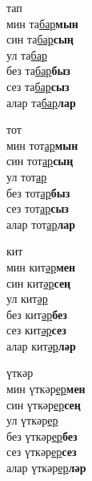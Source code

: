 \begin{multicols}{4}
\begin{enumerate}
\begin{minipage}{\linewidth}
    \item
    тап\\
    мин та\underline{бар}\textbf{мын}\\
    син та\underline{бар}\textbf{сың}\\
    ул та\underline{бар}\\
    без та\underline{бар}\textbf{быз}\\
    сез та\underline{бар}\textbf{сыз}\\
    алар та\underline{бар}\textbf{лар}\\
\end{minipage}

\begin{minipage}{\linewidth}
    \item
    тот\\
    мин тот\underline{ар}\textbf{мын}\\
    син тот\underline{ар}\textbf{сың}\\
    ул тот\underline{ар}\\
    без тот\underline{ар}\textbf{быз}\\
    сез тот\underline{ар}\textbf{сыз}\\
    алар тот\underline{ар}\textbf{лар}\\
\end{minipage}

\begin{minipage}{\linewidth}
    \item
    кит\\
    мин кит\underline{әр}\textbf{мен}\\
    син кит\underline{әр}\textbf{сең}\\
    ул кит\underline{әр}\\
    без кит\underline{әр}\textbf{без}\\
    сез кит\underline{әр}\textbf{сез}\\
    алар кит\underline{әр}\textbf{ләр}\\
\end{minipage}

\begin{minipage}{\linewidth}
    \item
    үткәр\\
    мин үткәр\underline{ер}\textbf{мен}\\
    син үткәр\underline{ер}\textbf{сең}\\
    ул үткәр\underline{ер}\\
    без үткәр\underline{ер}\textbf{без}\\
    сез үткәр\underline{ер}\textbf{сез}\\
    алар үткәр\underline{ер}\textbf{ләр}\\
\end{minipage}


\end{enumerate}
\end{multicols}
